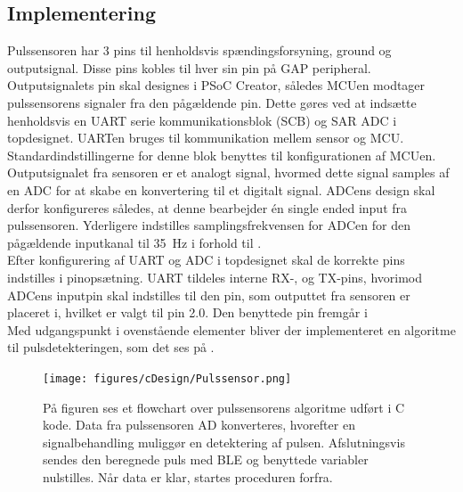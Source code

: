 \subsection{Implementering} \label{puls_impl}
Pulssensoren har 3 pins til henholdsvis spændingsforsyning, ground og outputsignal. Disse pins kobles til hver sin pin på GAP peripheral. Outputsignalets pin skal designes i PSoC Creator, således MCUen modtager pulssensorens signaler fra den pågældende pin. Dette gøres ved at indsætte henholdsvis en UART serie kommunikationsblok (SCB) og SAR ADC i topdesignet. UARTen bruges til kommunikation mellem sensor og MCU. Standardindstillingerne for denne blok benyttes til konfigurationen af MCUen. \newline
Outputsignalet fra sensoren er et analogt signal, hvormed dette signal samples af en ADC for at skabe en konvertering til et digitalt signal. ADCens design skal derfor konfigureres således, at denne bearbejder én single ended input fra pulssensoren. Yderligere indstilles samplingsfrekvensen for ADCen for den pågældende inputkanal til 35~Hz i forhold til . \\
Efter konfigurering af UART og ADC i topdesignet skal de korrekte pins indstilles i pinopsætning. UART tildeles interne RX-, og TX-pins, hvorimod ADCens inputpin skal indstilles til den pin, som outputtet fra sensoren er placeret i, hvilket er valgt til pin 2.0. Den benyttede pin fremgår i  \\
Med udgangspunkt i ovenstående elementer bliver der implementeret en algoritme til pulsdetekteringen, som det ses på .
\begin{figure}[H]
	\centering
	\texttt{[image: figures/cDesign/Pulssensor.png]}
	\caption{På figuren ses et flowchart over pulssensorens algoritme udført i C kode. Data fra pulssensoren AD konverteres, hvorefter en signalbehandling muliggør en detektering af pulsen. Afslutningsvis sendes den beregnede puls med BLE og benyttede variabler nulstilles. Når data er klar, startes proceduren forfra.}
	\label{fig:puls_pseudo_c}
\end{figure} \vspace{-.25cm}
